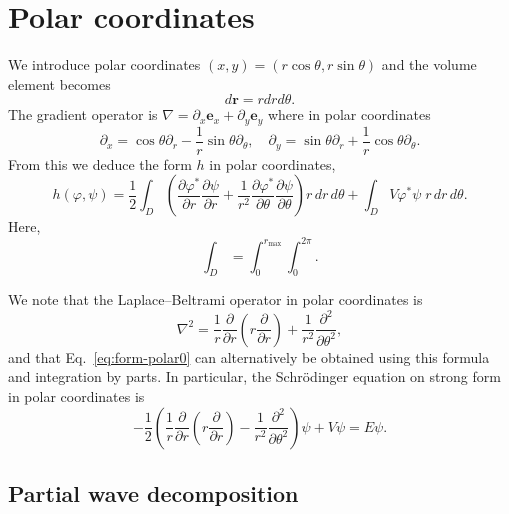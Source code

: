 \documentclass[12pt]{article}
\newcommand{\pdiff}[2]{\frac{\partial #1}{\partial #2}}
\begin{document}
\section{Polar coordinates}

We introduce polar coordinates $(x,y) = (r\cos\theta,r\sin\theta)$ and the volume element becomes
\begin{equation}
    d\mathbf{r} = r dr d\theta.
\end{equation}
The gradient operator is $\nabla = \partial_x \mathbf{e}_x + \partial_y \mathbf{e}_y$ where in polar coordinates
\begin{equation}
    \partial_x = \cos\theta \partial_r - \frac{1}{r} \sin\theta \partial_\theta, \quad \partial_y = \sin\theta \partial_r + \frac{1}{r} \cos\theta \partial_\theta.
\end{equation}
From this we deduce the form $h$ in polar coordinates,
\begin{equation}
    h(\varphi,\psi) = \frac{1}{2} \int_D \left( \pdiff{\varphi^*}{r} \pdiff{\psi}{r} + \frac{1}{r^2} \pdiff{\varphi^*}{\theta} \pdiff{\psi}{\theta} \right) r \, dr\, d\theta + \int_D V \varphi^* \psi \; r \, dr \, d\theta. 
    \label{eq:form-polar0}
\end{equation}
Here,
\begin{equation}
    \int_D = \int_0^{r_\text{max}} \int_0^{2\pi}.
\end{equation}


We note that the Laplace--Beltrami operator in polar coordinates is
\begin{equation}
  \nabla^2 =
\frac{1}{r} \frac{\partial}{\partial r} \left( r \frac{\partial}{\partial r} \right) + \frac{1}{r^2} \frac{\partial^2}{\partial\theta^2},
\end{equation}
and that Eq.~\eqref{eq:form-polar0} can alternatively be obtained using this formula and integration by parts. In particular, the Schrödinger equation on strong form in polar coordinates is
\begin{equation}
    -\frac{1}{2} \left( \frac{1}{r} \frac{\partial}{\partial r} \left( r \frac{\partial}{\partial r} \right) - \frac{1}{r^2} \frac{\partial^2}{\partial\theta^2} \right) \psi + V \psi = E \psi.
\end{equation}

\subsection{Partial wave decomposition}
\end{document}
